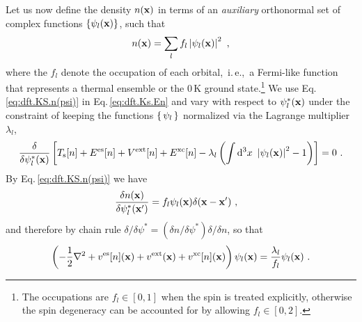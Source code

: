 Let us now define the density $n({\bf x})$ in terms of an \emph{auxiliary} orthonormal set of complex functions $\{ \psi_l ({\bf x}) \}$, such that
\begin{align}
	n({\bf x}) = \sum_l f_l \left\lvert \psi_l ({\bf x}) \right\rvert^2~,
	\label{eq:dft.KS.n(psi)}
\end{align}
where the $f_l$ denote the occupation of each orbital,~i.\,e.,~a Fermi-like function that represents a thermal ensemble or the 0\,K ground state.\footnote{The occupations are $f_l \in [0, 1]$ when the spin is treated explicitly, otherwise the spin degeneracy can be accounted for by allowing $f_l \in [0, 2]$.} We use Eq.\,\eqref{eq:dft.KS.n(psi)} in Eq.\,\eqref{eq:dft.Ks.En} and vary with respect to $\psi^\ast_l ({\bf x})$ under the constraint of keeping the functions $\set{\psi_l}$ normalized via the Lagrange multiplier $\lambda_l$,
\begin{align}
	\frac{\delta}{\delta \psi^\ast_l ({\bf x})}
		\left[
			T_{\rm s}[n] +  E^{\rm es}[n] + V^{\rm ext}[n] + E^{\rm xc} [n]
			- \lambda_l \left(
				\int \d^3 x ~ \left\lvert \psi_l ({\bf x}) \right\rvert^2 - 1
			\right)
		\right]
		= 0~.
	\label{eq:dft.Ks.variation.1}
\end{align}
By Eq.\,\eqref{eq:dft.KS.n(psi)} we have
\begin{align}
	\frac{\delta n({\bf x})}{\delta \psi^\ast_l ({\bf x}')}
		&= f_l \psi_l ({\bf x}) \delta ({\bf x} - {\bf x}')~,
	\label{eq:dft.KS.dn}
\end{align}
and therefore by chain rule 
$\delta / \delta \psi^\ast = (\delta n / \delta \psi^\ast) \delta / \delta n$, so that
\begin{align}
	\left(
		-\frac{1}{2} \nabla^2 
		+ v^{\rm es} [n] ({\bf x})
		+ v^{\rm ext}  ({\bf x})
		+ v^{\rm xc} [n] ({\bf x})
	\right) \psi_l ({\bf x})
	= \frac{\lambda_l}{f_l} \psi_l ({\bf x})~.
	\label{eq:dft.KS.1}
\end{align}

